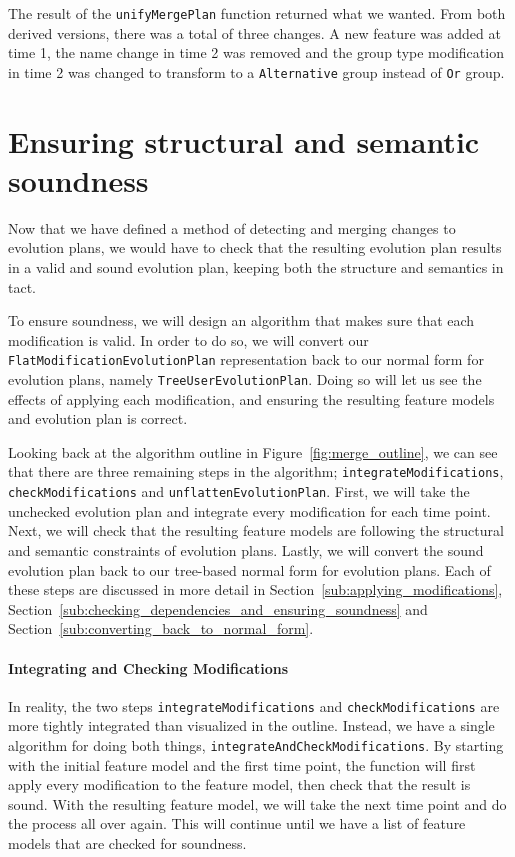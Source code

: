 \documentclass[a4paper,english]{ifimaster}
\begin{document}
The result of the \texttt{unifyMergePlan} function returned what we wanted. From both derived versions, there was a total of three changes. A new feature was added at time 1, the name change in time 2 was removed and the group type modification in time 2 was changed to transform to a \texttt{Alternative} group instead of \texttt{Or} group.

\section{Ensuring structural and semantic soundness}%
\label{sec:ensuring_structural_and_semantic_soundness_of_merge_result}

Now that we have defined a method of detecting and merging changes to evolution plans, we would have to check that the resulting evolution plan results in a valid and sound evolution plan, keeping both the structure and semantics in tact.

To ensure soundness, we will design an algorithm that makes sure that each modification is valid. In order to do so, we will convert our \texttt{FlatModificationEvolutionPlan} representation back to our normal form for evolution plans, namely \texttt{TreeUserEvolutionPlan}. Doing so will let us see the effects of applying each modification, and ensuring the resulting feature models and evolution plan is correct.

Looking back at the algorithm outline in Figure~\vref{fig:merge_outline}, we can see that there are three remaining steps in the algorithm; \texttt{integrateModifications}, \texttt{checkModifications} and \texttt{unflattenEvolutionPlan}. First, we will take the unchecked evolution plan and integrate every modification for each time point. Next, we will check that the resulting feature models are following the structural and semantic constraints of evolution plans. Lastly, we will convert the sound evolution plan back to our tree-based normal form for evolution plans. Each of these steps are discussed in more detail in Section~\ref{sub:applying_modifications}, Section~\ref{sub:checking_dependencies_and_ensuring_soundness} and Section~\ref{sub:converting_back_to_normal_form}. 

\paragraph{Integrating and Checking Modifications}%
\label{par:integrating_and_checking_modifications}

In reality, the two steps \texttt{integrateModifications} and \texttt{checkModifications} are more tightly integrated than visualized in the outline. Instead, we have a single algorithm for doing both things, \texttt{integrateAndCheckModifications}. By starting with the initial feature model and the first time point, the function will first apply every modification to the feature model, then check that the result is sound. With the resulting feature model, we will take the next time point and do the process all over again. This will continue until we have a list of feature models that are checked for soundness.
\end{document}
